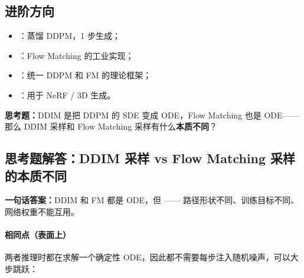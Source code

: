 \subsection{进阶方向}

\begin{itemize}
  \item {}：蒸馏 DDPM，1 步生成；
  \item {}：Flow Matching 的工业实现；
  \item {}：统一 DDPM 和 FM 的理论框架；
  \item {}：用于 NeRF / 3D 生成。
\end{itemize}

\medskip
{}

\medskip
\begin{warnbox}
\textbf{思考题：}DDIM 是把 DDPM 的 SDE 变成 ODE，Flow Matching 也是 ODE——那么
DDIM 采样和 Flow Matching 采样有什么\textbf{本质不同}？

\medskip
{}
\end{warnbox}

\subsection*{思考题解答：DDIM 采样 vs Flow Matching 采样的本质不同}

\begin{conceptbox}
\textbf{一句话答案：}DDIM 和 FM 都是 ODE，但 ——
路径形状不同、训练目标不同、网络权重不能互用。
\end{conceptbox}

\paragraph{相同点（表面上）}

两者推理时都在求解一个确定性 ODE，因此都不需要每步注入随机噪声，可以大步跳跃：

